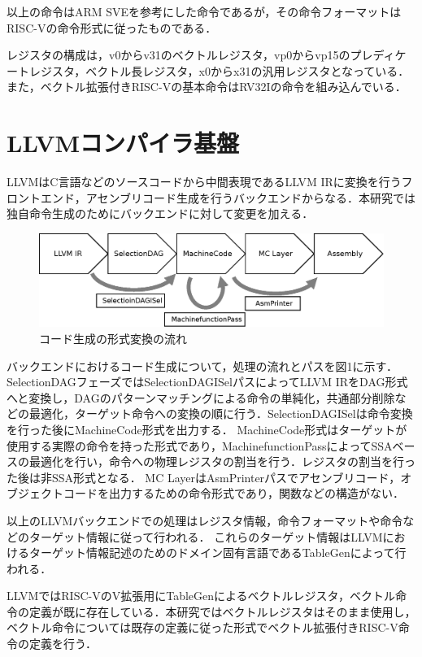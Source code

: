 \documentclass[a4paper,9pt, twocolumn]{jarticle}
\begin{document}
以上の命令はARM SVEを参考にした命令であるが，その命令フォーマットはRISC-Vの命令形式に従ったものである．

レジスタの構成は，v0からv31のベクトルレジスタ，vp0からvp15のプレディケートレジスタ，ベクトル長レジスタ，x0からx31の汎用レジスタとなっている．
また，ベクトル拡張付きRISC-Vの基本命令はRV32Iの命令を組み込んでいる．

\section{LLVMコンパイラ基盤}
LLVMはC言語などのソースコードから中間表現であるLLVM IRに変換を行うフロントエンド，アセンブリコード生成を行うバックエンドからなる．本研究では独自命令生成のためにバックエンドに対して変更を加える．

\begin{figure}[t]
    \centering
        \includegraphics[scale=0.4]{backend.eps}
    \caption{コード生成の形式変換の流れ}
    \label{fig:backend}
\end{figure}

バックエンドにおけるコード生成について，処理の流れとパスを図1に示す．
SelectionDAGフェーズではSelectionDAGISelパスによってLLVM IRをDAG形式へと変換し，DAGのパターンマッチングによる命令の単純化，共通部分削除などの最適化，ターゲット命令への変換の順に行う．SelectionDAGISelは命令変換を行った後にMachineCode形式を出力する．
MachineCode形式はターゲットが使用する実際の命令を持った形式であり，MachinefunctionPassによってSSAベースの最適化を行い，命令への物理レジスタの割当を行う．レジスタの割当を行った後は非SSA形式となる．
MC LayerはAsmPrinterパスでアセンブリコード，オブジェクトコードを出力するための命令形式であり，関数などの構造がない．

以上のLLVMバックエンドでの処理はレジスタ情報，命令フォーマットや命令などのターゲット情報に従って行われる．
これらのターゲット情報はLLVMにおけるターゲット情報記述のためのドメイン固有言語であるTableGenによって行われる．

LLVMではRISC-VのV拡張用にTableGenによるベクトルレジスタ，ベクトル命令の定義が既に存在している．本研究ではベクトルレジスタはそのまま使用し，ベクトル命令については既存の定義に従った形式でベクトル拡張付きRISC-V命令の定義を行う．
\end{document}
